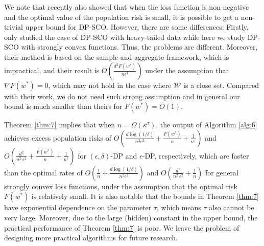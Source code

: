 \documentclass[12pt]{alt2022} %
\begin{document}
We note that recently \citep{wang2020differentially} also showed that when  the loss function is non-negative and the optimal value of the population risk is small, it is possible to get a non-trivial upper bound for DP-SCO. However, there are some differences: Firstly, \citep{wang2020differentially} only studied the case of DP-SCO with heavy-tailed data while here we study DP-SCO with strongly convex functions. Thus, the problems are different. Moreover, their method is based on the sample-and-aggregate framework, which is impractical, and their result is $O(\frac{d^3 F(w^*)}{n\epsilon^4})$ under the assumption that $\nabla F(w^*)=0$, which may not hold in the case where $\mathcal{W}$ is a close set. Compared with their work, we do not need such strong assumption and in general our bound is much smaller than theirs for $F(w^*)=O(1)$. 
\begin{remark}
Theorem \ref{thm:7} implies that when $n=\Omega(\kappa^\tau)$, the output of Algorithm \ref{alg:6} achieves excess population risks of $O(\frac{d\log(1/\delta)}{n^2\epsilon^2}+\frac{ F(w^*)}{n}+\frac{1}{n^\tau})$ and $O(\frac{d^2}{n^2\
\epsilon^2}+\frac{ F(w^*)}{n}+\frac{1}{n^\tau})$ for $(\epsilon, \delta)$-DP and $\epsilon$-DP, respectively, which are faster than the optimal rates of $O(\frac{1}{n}+\frac{d\log(1/\delta)}{n^2\epsilon^2})$ and $O(\frac{d^2}{n^2\
\epsilon^2}+\frac{1}{n})$ for general strongly convex loss functions, under the assumption that the optimal risk $F(w^*)$ is relatively small. It is also notable that the bounds in Theorem \ref{thm:7} have exponential dependence on the parameter $\tau$, which means $\tau$ also cannot be very large. Moreover, due to the large (hidden) constant in the upper bound, the practical performance of Theorem \ref{thm:7} is poor. We leave the problem of designing more practical algorithms for future research. 
\end{remark}
 
\end{document}
